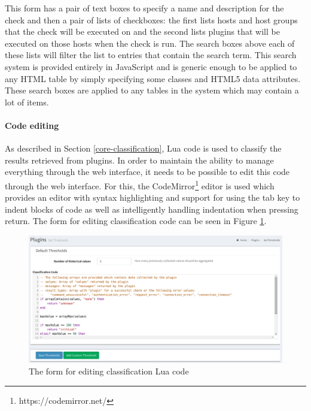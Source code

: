 \documentclass[bsc,logo,twoside,parskip,singlespacing,notimes]{infthesis}
\begin{document}
	This form has a pair of text boxes to specify a name and description for the
	check and then a pair of lists of checkboxes: the first lists hosts and host
	groups that the check will be executed on and the second lists plugins that
	will be executed on those hosts when the check is run.  The search boxes above
	each of these lists will filter the list to entries that contain the search
	term. This search system is provided entirely in JavaScript and is generic
	enough to be applied to any HTML table by simply specifying some classes and
	HTML5 data attributes.  These search boxes are applied to any tables in the
	system which may contain a lot of items.

\paragraph*{Code editing}
	As described in Section \ref{core-classification}, Lua code is used to classify
	the results retrieved from plugins.  In order to maintain the ability to manage
	everything through the web interface, it needs to be possible to edit this code
	through the web interface.  For this, the
	CodeMirror\footnote{https://codemirror.net/} editor is used which provides an
	editor with syntax highlighting and support for using the tab key to indent
	blocks of code as well as intelligently handling indentation when pressing
	return.  The form for editing classification code can be seen in Figure
	\ref{set-thresholds}.

\begin{figure}[H]
	\caption{The form for editing classification Lua code}
	\label{set-thresholds}
	\includegraphics[scale=0.45]{assets/screenshots/set-thresholds.pdf}
\end{figure}
\end{document}
